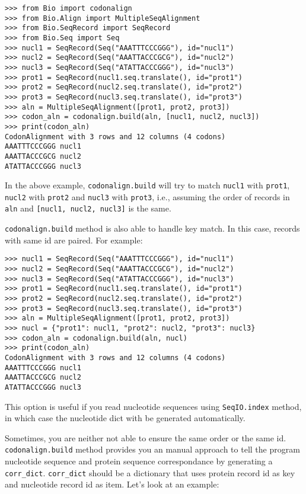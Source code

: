 \documentclass{article}
\begin{document}
\begin{verbatim}
>>> from Bio import codonalign
>>> from Bio.Align import MultipleSeqAlignment
>>> from Bio.SeqRecord import SeqRecord
>>> from Bio.Seq import Seq
>>> nucl1 = SeqRecord(Seq("AAATTTCCCGGG"), id="nucl1")
>>> nucl2 = SeqRecord(Seq("AAATTACCCGCG"), id="nucl2")
>>> nucl3 = SeqRecord(Seq("ATATTACCCGGG"), id="nucl3")
>>> prot1 = SeqRecord(nucl1.seq.translate(), id="prot1")
>>> prot2 = SeqRecord(nucl2.seq.translate(), id="prot2")
>>> prot3 = SeqRecord(nucl3.seq.translate(), id="prot3")
>>> aln = MultipleSeqAlignment([prot1, prot2, prot3])
>>> codon_aln = codonalign.build(aln, [nucl1, nucl2, nucl3])
>>> print(codon_aln)
CodonAlignment with 3 rows and 12 columns (4 codons)
AAATTTCCCGGG nucl1
AAATTACCCGCG nucl2
ATATTACCCGGG nucl3
\end{verbatim}

In the above example, \texttt{codonalign.build} will try to match
\texttt{nucl1} with \texttt{prot1}, \texttt{nucl2} with \texttt{prot2}
and \texttt{nucl3} with \texttt{prot3}, i.e., assuming the order of
records in \texttt{aln} and \texttt{{[}nucl1, nucl2, nucl3{]}} is the
same.

\texttt{codonalign.build} method is also able to handle key match. In
this case, records with same id are paired. For example:

\begin{verbatim}
>>> nucl1 = SeqRecord(Seq("AAATTTCCCGGG"), id="nucl1")
>>> nucl2 = SeqRecord(Seq("AAATTACCCGCG"), id="nucl2")
>>> nucl3 = SeqRecord(Seq("ATATTACCCGGG"), id="nucl3")
>>> prot1 = SeqRecord(nucl1.seq.translate(), id="prot1")
>>> prot2 = SeqRecord(nucl2.seq.translate(), id="prot2")
>>> prot3 = SeqRecord(nucl3.seq.translate(), id="prot3")
>>> aln = MultipleSeqAlignment([prot1, prot2, prot3])
>>> nucl = {"prot1": nucl1, "prot2": nucl2, "prot3": nucl3}
>>> codon_aln = codonalign.build(aln, nucl)
>>> print(codon_aln)
CodonAlignment with 3 rows and 12 columns (4 codons)
AAATTTCCCGGG nucl1
AAATTACCCGCG nucl2
ATATTACCCGGG nucl3
\end{verbatim}

This option is useful if you read nucleotide sequences using
\texttt{SeqIO.index} method, in which case the nucleotide dict with be
generated automatically.

Sometimes, you are neither not able to ensure the same order or the same
id. \texttt{codonalign.build} method provides you an manual approach to
tell the program nucleotide sequence and protein sequence correspondance
by generating a \texttt{corr\_dict}. \texttt{corr\_dict} should be a
dictionary that uses protein record id as key and nucleotide record id
as item. Let's look at an example:
\end{document}
